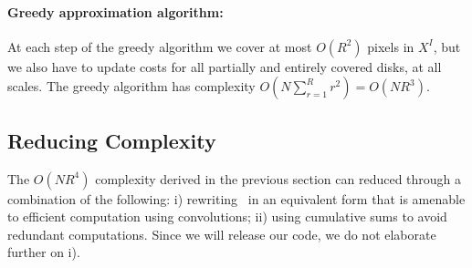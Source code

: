 \documentclass[10pt,twocolumn,letterpaper]{article}
\begin{document}

\paragraph{Greedy approximation algorithm:} At each step of the greedy algorithm we cover at most $O(R^2)$ pixels in $X^I$,
but we also have to update costs for all partially and entirely covered disks, at all scales.
The greedy algorithm has complexity $O(N\sum_{r=1}^R r^2) = O(NR^3)$.


\subsection{Reducing Complexity}\label{sec:complexity:reducing}
The $O(NR^4)$ complexity derived in the previous section can reduced through a combination of the following: 
i) rewriting~ in an equivalent form that is amenable to efficient computation using convolutions; 
ii) using cumulative sums to avoid redundant computations.
Since we will release our code, we do not elaborate further on i).
\end{document}
